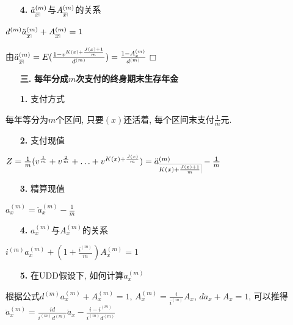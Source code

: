 \documentclass[a4paper,10pt]{ctexbook}
\makeatletter
\newcommand{\hei}{\CJKfamily{hei}}      %
\def\qed{\hfill$\Box$\medskip}
\DeclareRobustCommand{\annu}[1]{_{%
    \def\arraystretch{0}%
    \setlength\arraycolsep{1pt}%
    \setlength\arrayrulewidth{.2pt}%
    \begin{array}[b]{@{}c|}\hline
        \\[\arraycolsep]%
        \scriptstyle #1%
    \end{array}%
}}
\makeatother
\begin{document}
\begin{itemize}
    \item [{\bf\hei 4.}] $\ddot a_{\annu{x}}^{(m)}$与$A_{\annu{x}}^{(m)}$的关系
\end{itemize}

$d^{(m)}\ddot a_{\annu{x}}^{(m)} + A_{\annu{x}}^{(m)} = 1$

\proof 由$\ddot a_{\annu{x}}^{(m)} = E(\frac{1-v^{K(x)+\frac{J(x)+1}{m}}}{d^{(m)}}) = \frac{1-A_x^{(m)}}{d^{(m)}}$\qed

\begin{itemize}
    \item[{\bf\hei 三.}]{\bf\hei 每年分成$m$次支付的终身期末生存年金}
\end{itemize}

\begin{itemize}
    \item[{\bf\hei 1.}] 支付方式
\end{itemize}

每年等分为$m$个区间, 只要$(x)$还活着, 每个区间末支付$\frac1m$元.

\begin{itemize}
    \item[{\bf\hei 2.}] 支付现值
\end{itemize}

$Z = \frac1m(v^{\frac1m} + v^{\frac2m} + \ldots + v^{K(x)+\frac{J(x)}{m}}) = \ddot a_{\annu{K(x)+\frac{J(x)+1}{m}}}^{(m)} - \frac1m$

\begin{itemize}
    \item [{\bf\hei 3.}] 精算现值
\end{itemize}

$a_x^{(m)} = \ddot a_x^{(m)} - \frac1m$

\begin{itemize}
    \item[{\bf\hei 4.}] $a_{x}^{(m)}$与$A_{x}^{(m)}$的关系
\end{itemize}

$i^{(m)}a_{x}^{(m)} + (1+\frac{i^{(m)}}m)A_{x}^{(m)} = 1$

\begin{itemize}
    \item[{\bf\hei 5.}] 在UDD假设下, 如何计算$\ddot a_{x}^{(m)}$
\end{itemize}

根据公式$d^{(m)}a_x^{(m)} + A_x^{(m)} = 1$, $A_x^{(m)} = \frac{i}{i^{(m)}}A_x$, $d \ddot a_x + A_x = 1$, 可以推得$\ddot a_x^{(m)} = \frac{id}{i^{(m)}d^{(m)}}\ddot a_x - \frac{i - i^{(m)}}{i^{(m)}d^{(m)}}$
\end{document}
